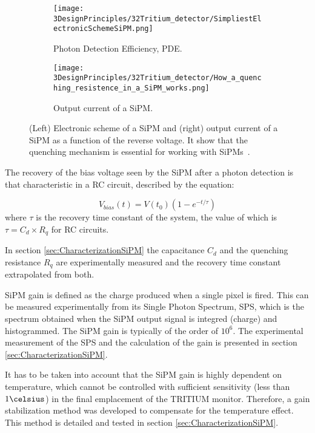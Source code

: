 \begin{figure}
\centering
    \begin{subfigure}[b]{0.45\textwidth}
    \centering
    \texttt{[image: 3DesignPrinciples/32Tritium\_detector/SimpliestElectronicSchemeSiPM.png]}  
    \caption{Photon Detection Efficiency, PDE.\label{subfig:ElectricModelSiPM}}
    \end{subfigure}
    \hfill
    \begin{subfigure}[b]{0.45\textwidth}
    \centering
    \texttt{[image: 3DesignPrinciples/32Tritium\_detector/How\_a\_quenching\_resistence\_in\_a\_SiPM\_works.png]}  
    \caption{Output current of a SiPM.\label{subfig:HowSiPMworks}}
    \end{subfigure}
 \caption{(Left) Electronic scheme of a SiPM and (right) output current of a SiPM as a function of the reverse voltage. It show that the quenching mechanism is essential for working with SiPMs~\cite{DataSheetSensL}.}
 \label{fig:ChenchingResistance}
\end{figure}

The recovery of the bias voltage seen by the SiPM after a photon detection is that characteristic in a RC circuit, described by the equation: 

\begin{equation}
V_{bias}(t)=V(t_0)\left(1-e^{-t/\tau} \right)
\label{RCCircuitBiasVoltage}
\end{equation}
where $\tau$ is the recovery time constant of the system, the value of which is $\tau=C_d \times R_q$ for RC circuits.

In section \ref{sec:CharacterizationSiPM} the capacitance $C_d$ and the quenching resistance $R_q$ are experimentally measured and the recovery time constant extrapolated from both.

SiPM gain is defined as the charge produced when a single pixel is fired. This can be measured experimentally from its Single Photon Spectrum, SPS, which is the spectrum obtained when the SiPM output signal is integred (charge) and histogrammed. The SiPM gain is typically of the order of $10^6$. The experimental measurement of the SPS and the calculation of the gain is presented in section \ref{sec:CharacterizationSiPM}.

It has to be taken into account that the SiPM gain is highly dependent on temperature, which cannot be controlled with sufficient sensitivity (less than $1\celsius$) in the final emplacement of the TRITIUM monitor. Therefore, a gain stabilization method was developed to compensate for the temperature effect. This method is detailed and tested in section \ref{sec:CharacterizationSiPM}.

